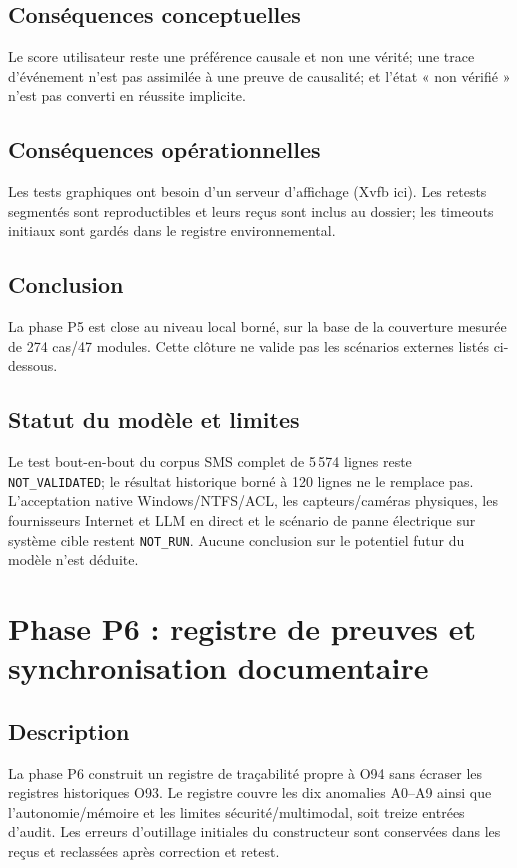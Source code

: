 \documentclass[11pt,a4paper]{article}
\begin{document}
\subsection{Conséquences conceptuelles}
Le score utilisateur reste une préférence causale et non une vérité; une trace d’événement n’est pas assimilée à une preuve de causalité; et l’état « non vérifié » n’est pas converti en réussite implicite.
\subsection{Conséquences opérationnelles}
Les tests graphiques ont besoin d’un serveur d’affichage (Xvfb ici). Les retests segmentés sont reproductibles et leurs reçus sont inclus au dossier; les timeouts initiaux sont gardés dans le registre environnemental.
\subsection{Conclusion}
La phase P5 est close au niveau local borné, sur la base de la couverture mesurée de 274 cas/47 modules. Cette clôture ne valide pas les scénarios externes listés ci-dessous.
\subsection{Statut du modèle et limites}
Le test bout-en-bout du corpus SMS complet de 5\,574 lignes reste \texttt{NOT\_VALIDATED}; le résultat historique borné à 120 lignes ne le remplace pas. L’acceptation native Windows/NTFS/ACL, les capteurs/caméras physiques, les fournisseurs Internet et LLM en direct et le scénario de panne électrique sur système cible restent \texttt{NOT\_RUN}. Aucune conclusion sur le potentiel futur du modèle n’est déduite.

\section{Phase P6 : registre de preuves et synchronisation documentaire}
\subsection{Description}
La phase P6 construit un registre de traçabilité propre à O94 sans écraser les registres historiques O93. Le registre couvre les dix anomalies A0--A9 ainsi que l’autonomie/mémoire et les limites sécurité/multimodal, soit treize entrées d’audit. Les erreurs d’outillage initiales du constructeur sont conservées dans les reçus et reclassées après correction et retest.
\end{document}
